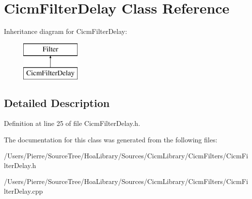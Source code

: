 \hypertarget{class_cicm_filter_delay}{\section{Cicm\-Filter\-Delay Class Reference}
\label{class_cicm_filter_delay}
}
Inheritance diagram for Cicm\-Filter\-Delay\-:\begin{figure}[H]
\begin{center}
\leavevmode
\includegraphics[height=2.000000cm]{class_cicm_filter_delay}
\end{center}
\end{figure}


\subsection{Detailed Description}


Definition at line 25 of file Cicm\-Filter\-Delay.\-h.



The documentation for this class was generated from the following files\-:\begin{DoxyCompactItemize}
\item 
/\-Users/\-Pierre/\-Source\-Tree/\-Hoa\-Library/\-Sources/\-Cicm\-Library/\-Cicm\-Filters/Cicm\-Filter\-Delay.\-h\item 
/\-Users/\-Pierre/\-Source\-Tree/\-Hoa\-Library/\-Sources/\-Cicm\-Library/\-Cicm\-Filters/Cicm\-Filter\-Delay.\-cpp\end{DoxyCompactItemize}
